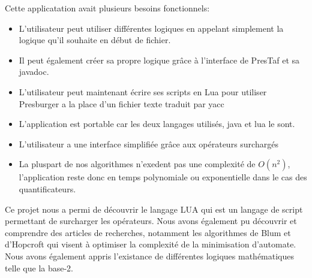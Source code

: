 \documentclass[12pt]{article}%
\begin{document}
Cette applicatation avait plusieurs besoins fonctionnels:
	\begin{itemize}
\item L'utilisateur peut utiliser différentes logiques en appelant simplement la logique qu'il souhaite en début de fichier.
\item Il peut également créer sa propre logique grâce à l'interface de PresTaf et sa javadoc.
\item L'utilisateur peut maintenant écrire ses scripts en Lua pour utiliser Presburger a la place d'un fichier texte traduit par yacc
\item L'application est portable car les deux langages utilisés, java et lua le sont.
\item L'utilisateur a une interface simplifiée grâce aux opérateurs surchargés
\item La pluspart de nos algorithmes n'exedent pas une complexité de $O(n^2)$, l'application reste donc en temps polynomiale ou exponentielle dans le cas des quantificateurs.
\end{itemize}

Ce projet nous a permi de découvrir le langage LUA qui est un langage de script permettant de surcharger les opérateurs. Nous avons également pu découvrir et comprendre des articles de recherches, notamment les algorithmes de Blum et d'Hopcroft qui visent à optimiser la complexité de la minimisation d'automate. Nous avons également appris l'existance de différentes logiques mathématiques telle que la base-2.


\appendix





%


%

\printglossaries

{}

\end{document}
